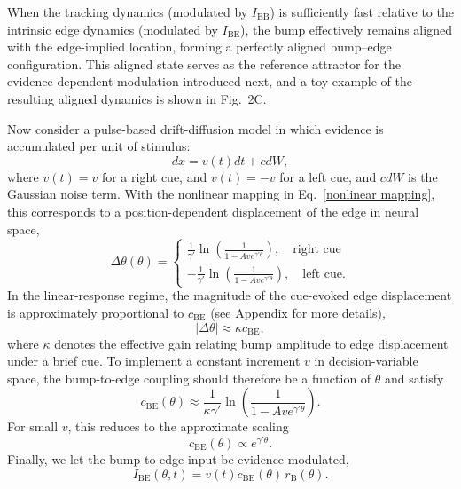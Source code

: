 \documentclass{article}
\newcommand{\rB}{r_{\text{B}}}
\newcommand{\IBE}{I_{\text{BE}}}
\newcommand{\IEB}{I_{\text{EB}}}
\newcommand{\cBE}{c_{\text{BE}}}
\newcommand{\gammaSig}{\gamma'}
\begin{document}
When the tracking dynamics (modulated by $\IEB$) is sufficiently fast relative to the intrinsic edge dynamics (modulated by $\IBE$), the bump effectively remains aligned with the edge-implied location, forming a perfectly aligned bump--edge configuration. This aligned state serves as the reference attractor for the evidence-dependent modulation introduced next, and a toy example of the resulting aligned dynamics is shown in Fig.~2C.

Now consider a pulse-based drift-diffusion model in which evidence is accumulated per unit of stimulus:
\begin{equation}
    dx = v(t)dt + cdW,
\end{equation}
where $v(t)=v$ for a right cue, and $v(t)=-v$ for a left cue, and $cdW$ is the Gaussian noise term.  
With the nonlinear mapping in Eq.~\eqref{nonlinear mapping}, 
this corresponds to a position-dependent displacement of the edge in neural space,
\begin{equation}
    \Delta\theta(\theta)
    = \begin{cases}
    \frac{1}{\gammaSig}\ln\!\left(\frac{1}{1-Ave^{\gammaSig\theta}}\right),\quad \text{right cue}\\
    -\frac{1}{\gammaSig}\ln\!\left(\frac{1}{1-Ave^{\gammaSig\theta}}\right), \quad \text{left cue}.      
    \end{cases}
\end{equation}
In the linear-response regime, the magnitude of the cue-evoked edge displacement is approximately proportional to $\cBE$ (see Appendix for more details),
\begin{equation}
    |\Delta\theta| \approx \kappa \cBE,
\end{equation}
where $\kappa$ denotes the effective gain relating bump amplitude to edge displacement under a brief cue.
To implement a constant increment $v$ in decision-variable space, the bump-to-edge coupling should therefore be a function of $ \theta$ and satisfy
\begin{equation}
    \cBE(\theta)
    \approx
    \frac{1}{\kappa \gammaSig}
    \ln\!\left(\frac{1}{1-Ave^{\gammaSig\theta}}\right).
\end{equation}
For small $v$, this reduces to the approximate scaling
\begin{equation}
    \cBE(\theta) \propto e^{\gammaSig\theta}.
\end{equation}
Finally, we let the bump-to-edge input be evidence-modulated,
\begin{equation}
    \IBE(\theta,t)=
    v(t)
    \cBE(\theta)\, \rB(\theta).
\end{equation}
\end{document}
